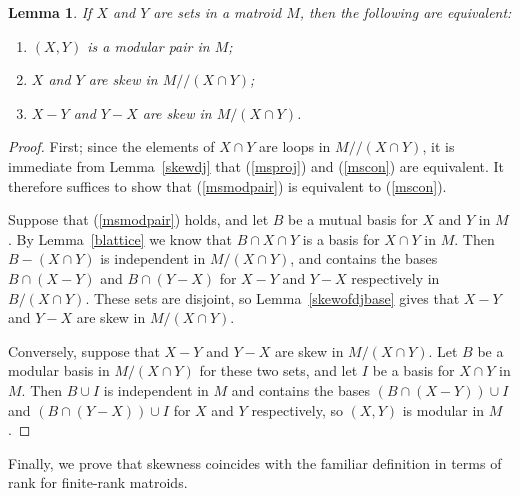 \documentclass{amsart}
\theoremstyle{plain}
\newtheorem{lemma}[theorem]{Lemma}
\theoremstyle{definition}
\newcommand{\dcon}{/ \!\! /}
\newcommand{\con}{/}
\begin{document}
\begin{lemma}\label{modulartoskew}
  If $X$ and $Y$ are sets in a matroid $M$, then the following are equivalent:
  \begin{enumerate}[(1)]
    \item\label{msmodpair} $(X,Y)$ is a modular pair in $M$;
    \item\label{msproj} $X$ and $Y$ are skew in $M \dcon (X \cap Y)$;
    \item\label{mscon} $X - Y$ and $Y-X$ are skew in $M \con (X \cap Y)$. 
  \end{enumerate}
\end{lemma}
\begin{proof}
  First; since the elements of $X \cap Y$ are loops in $M \dcon (X \cap Y)$, 
  it is immediate from Lemma~\ref{skewdj} that (\ref{msproj}) and (\ref{mscon}) are equivalent. 
  It therefore suffices to show that (\ref{msmodpair}) is equivalent to (\ref{mscon}). 

  Suppose that (\ref{msmodpair}) holds, and let $B$ be a mutual basis for $X$ and $Y$ in $M$. 
  By Lemma~\ref{blattice} we know that $B \cap X \cap Y$ is a basis for $X \cap Y$ in $M$. 
  Then $B - (X \cap Y)$ is independent in $M \con (X \cap Y)$, and contains the bases $B \cap (X - Y)$
  and $B \cap (Y-X)$ for $X-Y$ and $Y-X$ respectively in $B \con (X \cap Y)$. 
  These sets are disjoint, so Lemma~\ref{skewofdjbase} gives that $X-Y$ and $Y-X$ are skew in $M \con (X \cap Y)$. 

  Conversely, suppose that $X - Y$ and $Y-X$ are skew in $M \con (X \cap Y)$. 
  Let $B$ be a modular basis in $M \con (X \cap Y)$ for these two sets, and let $I$ be a basis for $X \cap Y$ in $M$. 
  Then $B \cup I$ is independent in $M$ and contains the bases $(B \cap (X - Y)) \cup I$ 
  and $(B \cap (Y-X)) \cup I$ for $X$ and $Y$ respectively, so $(X,Y)$ is modular in $M$. 
\end{proof}


Finally, we prove that skewness coincides with the familiar definition in terms of rank for finite-rank matroids. 
\end{document}
